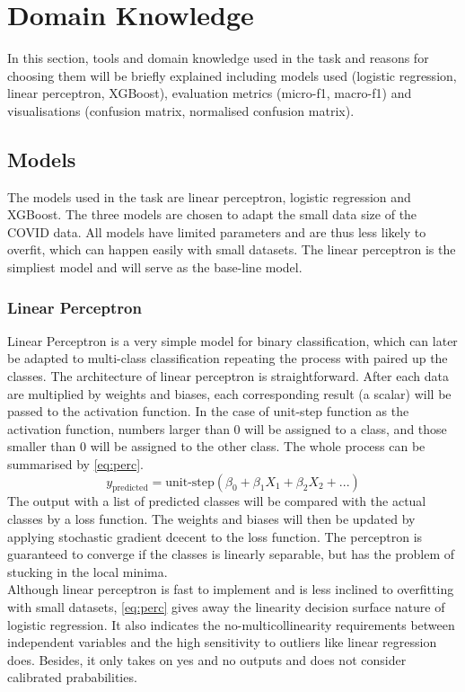 \documentclass[10pt, a4paper, twocolumn]{article} %
\begin{document}
\section{Domain Knowledge}\label{sec:domain_knowledge}
In this section, tools and domain knowledge used in the task and reasons for choosing them  will be 
briefly explained including models used (logistic regression, linear perceptron, XGBoost), evaluation metrics 
(micro-f1, macro-f1) and visualisations (confusion matrix, normalised confusion matrix).\\
\subsection{Models}
The models used in the task are linear perceptron, logistic regression and XGBoost. The three models are chosen to adapt 
the small data size of the COVID data. All models have limited parameters and are thus less likely to overfit, which 
can happen easily with small datasets. The linear perceptron is the simpliest model and will serve as the base-line model. 
\subsubsection{Linear Perceptron}
Linear Perceptron\citep{Sagar}\citep{Ali} is a very simple model for binary classification, which can later be adapted to multi-class classification 
repeating the process with paired up the classes. The architecture of linear perceptron is straightforward. After 
each data are multiplied by weights and biases, each corresponding result (a scalar) will be passed to the activation function. In the case of 
unit-step function as the activation function, numbers larger than 0 will be assigned to a class, and those smaller than 0 will be 
assigned to the other class. The whole process can be summarised by \autoref{eq:perc}.
\begin{equation}\label{eq:perc}
	y_\text{predicted} = \text{unit-step}\left(\beta_0 + \beta_1X_1+ \beta_2X_2+ ...\right)
\end{equation}
The output with a list of predicted classes will be compared with the actual classes by a loss function. 
The weights and biases will then be updated by applying stochastic gradient dcecent\citep{Abhijit} to the loss function. The perceptron is 
guaranteed to converge if the classes is linearly separable, but has the problem of stucking in the local minima.\\[10pt]
Although linear perceptron is fast to implement and is less inclined to overfitting with small datasets, \autoref{eq:perc} gives away 
the linearity decision surface nature of logistic regression. It also indicates the no-multicollinearity requirements between 
independent variables and the high sensitivity to outliers like linear regression does. Besides, it only takes on yes and no outputs 
and does not consider calibrated prababilities.
\end{document}
